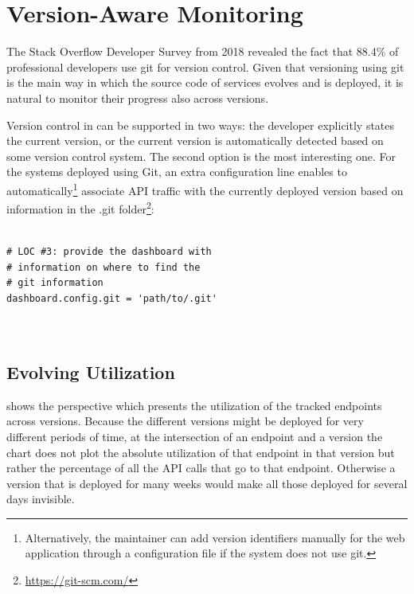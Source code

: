   
  \section{Version-Aware Monitoring}
  \label{sec:version}
  
  The Stack Overflow Developer Survey from 2018 revealed the fact that 88.4\% of professional developers use git for version control. 
  Given that versioning using git is the main way in which the source code of services evolves and is deployed, it is natural to monitor their progress also across versions. 

  Version control in \tool can be supported in two ways:
  the developer explicitly states the current version, 
  or the current version is automatically detected based
  on some version control system. 
  The second option is the most interesting one.
  For the systems deployed using Git, an extra configuration line enables \tool to automatically\footnote{Alternatively, the maintainer can add version identifiers manually for the web application through a configuration file if the system does not use git.} associate API traffic with the currently deployed version based on information in the .git folder\footnote{\url{https://git-scm.com/}}: 
    
\begin{lstlisting}[style=custompython]

# LOC #3: provide the dashboard with 
# information on where to find the 
# git information 
dashboard.config.git = 'path/to/.git'
  
      
\end{lstlisting}  
 

  

  \subsection*{Evolving Utilization}

   shows the  perspective which presents the utilization of the tracked endpoints across versions. Because the different versions might be deployed for very different periods of time, at the intersection of an endpoint and a version the chart does not plot the absolute utilization of that endpoint in that version but rather the percentage of all the API calls that go to that endpoint. Otherwise a version that is deployed for many weeks would make all those deployed for several days invisible.


